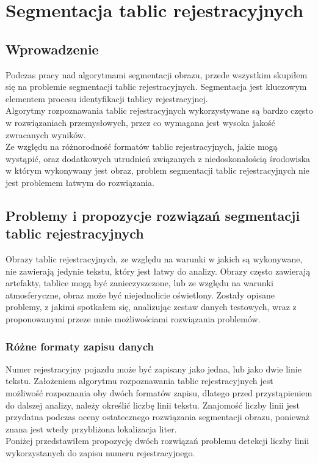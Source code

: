 \section{Segmentacja tablic rejestracyjnych}
\subsection{Wprowadzenie}
Podczas pracy nad algorytmami segmentacji obrazu, przede wszystkim skupiłem się na problemie segmentacji tablic rejestracyjnych. Segmentacja jest kluczowym elementem procesu identyfikacji tablicy rejestracyjnej.\\
Algorytmy rozpoznawania tablic rejestracyjnych wykorzystywane są bardzo często w rozwiązaniach przemysłowych, przez co wymagana jest wysoka jakość zwracanych wyników.\\
Ze względu na różnorodność formatów tablic rejestracyjnych, jakie mogą wystąpić, oraz dodatkowych utrudnień związanych z niedoskonałością środowiska w którym wykonywany jest obraz, problem segmentacji tablic rejestracyjnych nie jest problemem łatwym do rozwiązania.
\subsection{Problemy i propozycje rozwiązań segmentacji tablic rejestracyjnych}
Obrazy tablic rejestracyjnych, ze względu na warunki w jakich są wykonywane, nie zawierają jedynie tekstu, który jest łatwy do analizy. Obrazy często zawierają artefakty, tablice mogą być zanieczyszczone, lub ze względu na warunki atmosferyczne, obraz może być niejednolicie oświetlony. Zostały opisane problemy, z jakimi spotkałem się, analizując zestaw danych testowych, wraz z proponowanymi przeze mnie możliwościami rozwiązania problemów.
\subsubsection{Różne formaty zapisu danych}
Numer rejestracyjny pojazdu może być zapisany jako jedna, lub jako dwie linie tekstu. Założeniem algorytmu rozpoznawania tablic rejestracyjnych jest możliwość rozpoznania oby dwóch formatów zapisu, dlatego przed przystąpieniem do dalszej analizy, należy określić liczbę linii tekstu. Znajomość liczby linii jest przydatna podczas oceny ostatecznego rozwiązania segmentacji obrazu, ponieważ znana jest wtedy przybliżona lokalizacja liter. \\
Poniżej przedstawiłem propozycję dwóch rozwiązań problemu detekcji liczby linii wykorzystanych do zapisu numeru rejestracyjnego.
